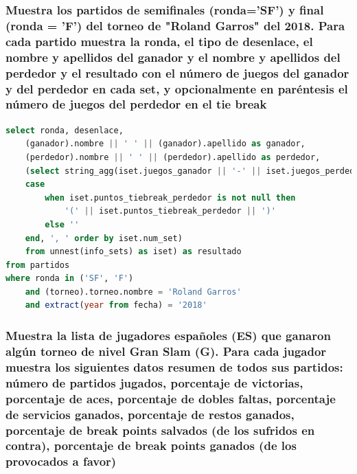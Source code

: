 \documentclass[10pt]{opticajnl}
\begin{document}
\subsubsection{Muestra los partidos de semiﬁnales (ronda='SF') y ﬁnal (ronda = 'F') del torneo de "Roland Garros" del 2018. Para cada partido muestra la ronda, el tipo de desenlace, el nombre y apellidos del ganador y el nombre y apellidos del perdedor y el resultado con el número de juegos del ganador y del perdedor en cada set, y opcionalmente en paréntesis el número de juegos del perdedor en el tie break}

\begin{lstlisting}[language=SQL]
select ronda, desenlace, 
	(ganador).nombre || ' ' || (ganador).apellido as ganador,
	(perdedor).nombre || ' ' || (perdedor).apellido as perdedor, 
	(select string_agg(iset.juegos_ganador || '-' || iset.juegos_perdedor ||
	case
		when iset.puntos_tiebreak_perdedor is not null then 
			'(' || iset.puntos_tiebreak_perdedor || ')'
		else ''
	end, ', ' order by iset.num_set) 
	from unnest(info_sets) as iset) as resultado
from partidos
where ronda in ('SF', 'F')
	and (torneo).torneo.nombre = 'Roland Garros'
	and extract(year from fecha) = '2018'
\end{lstlisting}





\subsubsection{Muestra la lista de jugadores españoles (ES) que ganaron algún torneo de nivel Gran Slam (G). Para cada jugador muestra los siguientes datos resumen de todos sus partidos: número de partidos jugados, porcentaje de victorias, porcentaje de aces, porcentaje de dobles faltas, porcentaje de servicios ganados, porcentaje de restos ganados, porcentaje de break points salvados (de los sufridos en contra), porcentaje de break points ganados (de los provocados a favor)}
\end{document}
